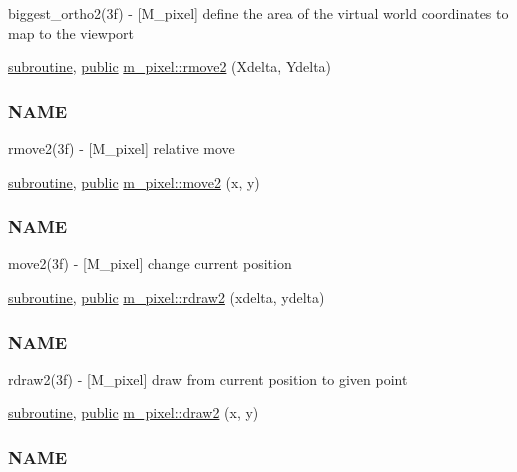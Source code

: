\begin{DoxyCompactItemize}
\begin{DoxyCompactList}
biggest\+\_\+ortho2(3f) -\/ \mbox{[}M\+\_\+pixel\mbox{]} define the area of the virtual world coordinates to map to the viewport \end{DoxyCompactList}\item 
\hyperlink{M__stopwatch_83_8txt_acfbcff50169d691ff02d4a123ed70482}{subroutine}, \hyperlink{M__stopwatch_83_8txt_a2f74811300c361e53b430611a7d1769f}{public} \hyperlink{namespacem__pixel_a9b0fb9ccafe605fd6daf50c74347ed3a}{m\+\_\+pixel\+::rmove2} (Xdelta, Ydelta)
\begin{DoxyCompactList}\small\item\em \subsubsection*{N\+A\+ME}

rmove2(3f) -\/ \mbox{[}M\+\_\+pixel\mbox{]} relative move \end{DoxyCompactList}\item 
\hyperlink{M__stopwatch_83_8txt_acfbcff50169d691ff02d4a123ed70482}{subroutine}, \hyperlink{M__stopwatch_83_8txt_a2f74811300c361e53b430611a7d1769f}{public} \hyperlink{namespacem__pixel_ab5d4dc474ff84dc0f3f35f4a395979e0}{m\+\_\+pixel\+::move2} (x, y)
\begin{DoxyCompactList}\small\item\em \subsubsection*{N\+A\+ME}

move2(3f) -\/ \mbox{[}M\+\_\+pixel\mbox{]} change current position \end{DoxyCompactList}\item 
\hyperlink{M__stopwatch_83_8txt_acfbcff50169d691ff02d4a123ed70482}{subroutine}, \hyperlink{M__stopwatch_83_8txt_a2f74811300c361e53b430611a7d1769f}{public} \hyperlink{namespacem__pixel_a664375b036092dbebe1bccdc67254e1d}{m\+\_\+pixel\+::rdraw2} (xdelta, ydelta)
\begin{DoxyCompactList}\small\item\em \subsubsection*{N\+A\+ME}

rdraw2(3f) -\/ \mbox{[}M\+\_\+pixel\mbox{]} draw from current position to given point \end{DoxyCompactList}\item 
\hyperlink{M__stopwatch_83_8txt_acfbcff50169d691ff02d4a123ed70482}{subroutine}, \hyperlink{M__stopwatch_83_8txt_a2f74811300c361e53b430611a7d1769f}{public} \hyperlink{namespacem__pixel_a12012e819bb14b27d2b49732aa2e4e55}{m\+\_\+pixel\+::draw2} (x, y)
\begin{DoxyCompactList}\small\item\em \subsubsection*{N\+A\+ME}


\end{DoxyCompactList}
\end{DoxyCompactItemize}
